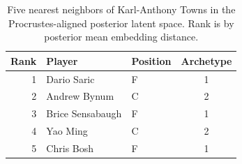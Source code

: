 \begin{table}[htbp]
  \centering\small
  \begin{tabular}{rllc}
    \toprule
    Rank & Player & Position & Archetype \\
    \midrule
    1 & Dario Saric & F & 1 \\
    2 & Andrew Bynum & C & 2 \\
    3 & Brice Sensabaugh & F & 1 \\
    4 & Yao Ming & C & 2 \\
    5 & Chris Bosh & F & 1 \\
    \bottomrule
  \end{tabular}
  \caption{Five nearest neighbors of Karl-Anthony Towns in the Procrustes-aligned posterior latent space. Rank is by posterior mean embedding distance.}
  \label{tab:Karl_Anthony_Towns_neighbors}
\end{table}

